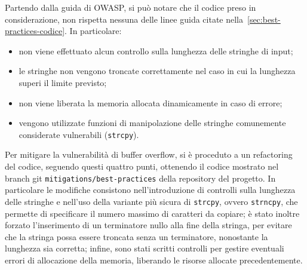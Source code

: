 Partendo dalla guida di OWASP\cite{owasp_best_practices}, si può notare che il codice
preso in considerazione, non rispetta nessuna delle linee guida citate nella~\autoref{sec:best-practices-codice}.
In particolare:
\begin{itemize}
  \item non viene effettuato alcun controllo sulla lunghezza delle stringhe di input;

  \item le stringhe non vengono troncate correttamente nel caso in cui la lunghezza
    superi il limite previsto;

  \item non viene liberata la memoria allocata dinamicamente in caso di errore;

  \item vengono utilizzate funzioni di manipolazione delle stringhe comunemente considerate
    vulnerabili (\texttt{strcpy}).
\end{itemize}

Per mitigare la vulnerabilità di buffer overflow, si è proceduto a un
refactoring del codice, seguendo questi quattro punti, ottenendo il codice
mostrato nel branch git \texttt{mitigations/best-practices} della repository del
progetto. In particolare le modifiche consistono nell'introduzione di controlli
sulla lunghezza delle stringhe e nell'uso della variante più sicura di \texttt{strcpy},
ovvero \texttt{strncpy}, che permette di specificare il numero massimo di
caratteri da copiare; è stato inoltre forzato l'inserimento di un terminatore nullo
alla fine della stringa, per evitare che la stringa possa essere troncata senza
un terminatore, nonostante la lunghezza sia corretta; infine, sono stati scritti
controlli per gestire eventuali errori di allocazione della memoria, liberando
le risorse allocate precedentemente.




